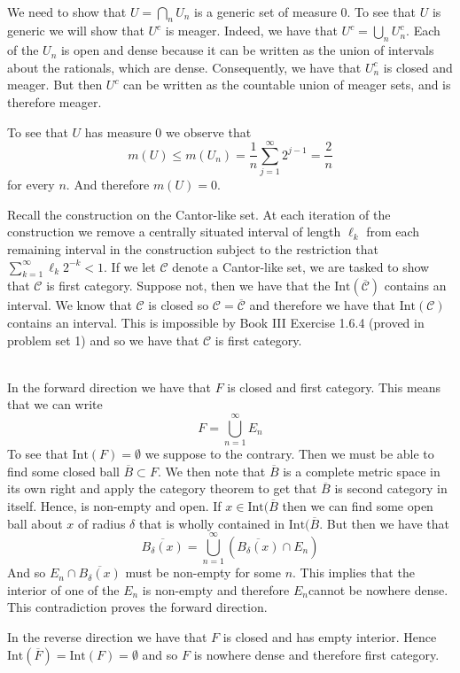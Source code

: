 \documentclass[6pt]{article}
\newcommand{\problem}[1]{\noindent{\textbf{Problem #1}}\\}
\newcommand{\problempart}[1]{\noindent{\textbf{(#1)}}}
\begin{document}
\problem{4.6.1} \problempart{a} We need to show that $U = \bigcap_n
U_n$ is a generic set of measure 0. To see that $U$ is generic we will
show that $U^c$ is meager. Indeed, we have that $U^c = \bigcup_n
U_n^c$. Each of the $U_n$ is open and dense because it can be written
as the union of intervals about the rationals, which are
dense. Consequently, we have that $U_n^c$ is closed and meager. But
then $U^c$ can be written as the countable union of meager sets, and
is therefore meager.

To see that $U$ has measure $0$ we observe that
\[
m(U) \leq m(U_n) = \frac{1}{n} \sum_{j=1}^\infty 2^{j-1} = \frac{2}{n}
\]
for every $n$. And therefore $m(U) = 0$.

\problempart{b} Recall the construction on the Cantor-like set. At
each iteration of the construction we remove a centrally situated
interval of length $\ell_k$ from each remaining interval in the
construction subject to the restriction that $\sum_{k=1}^\infty \ell_k
2^{-k} < 1$. If we let $\mathcal{C}$ denote a Cantor-like set, we are
tasked to show that $\mathcal{C}$ is first category. Suppose not, then
we have that the $\text{Int}(\overline{\mathcal{C}})$ contains an
interval. We know that $\mathcal{C}$ is closed so $\mathcal{C} =
\overline{\mathcal{C}}$ and therefore we have that
$\text{Int}(\mathcal{C})$ contains an interval. This is impossible by
Book III Exercise 1.6.4 (proved in problem set 1) and so we have that
$\mathcal{C}$ is first category.

\problem{4.6.2}
\problempart{a} In the forward direction we have that $F$ is closed and first category. This means that we can write 
\[
F = \bigcup_{n=1}^\infty E_n
\]
To see that $\text{Int}(F) = \emptyset$ we suppose to the contrary. Then we must be able to find some closed ball $\overline{B} \subset F$. We then note that $\overline{B}$ is a complete metric space in its own right and apply the category theorem to get that $\overline{B}$ is second category in itself. Hence, is non-empty and open. If $x \in \text{Int}(\overline{B}$ then we can find some open ball about $x$ of radius $\delta$ that is wholly contained in $\text{Int}(\overline{B}$. But then we have that 
\[
\overline{B_\delta(x)} = \bigcup_{n=1}^\infty (\overline{B_\delta(x)} \cap E_n)
\]
And so $E_n \cap \overline{B_\delta(x)}$ must be non-empty for some $n$. This implies that the interior of one of the $E_n$ is non-empty and therefore $E_n$cannot be nowhere dense. This contradiction proves the forward direction.

In the reverse direction we have that $F$ is closed and has empty interior. Hence $\text{Int}(\overline{F}) = \text{Int}(F) = \emptyset$ and so $F$ is nowhere dense and therefore first category. 
 
\end{document}
